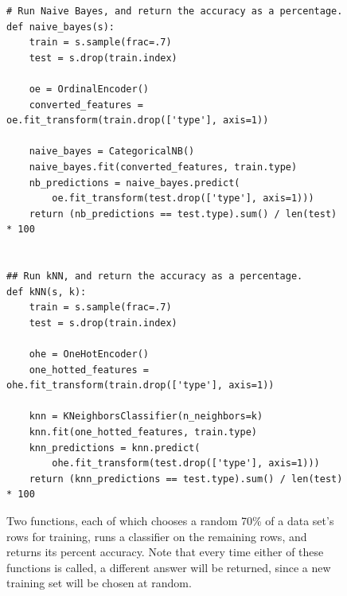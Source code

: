 \begin{figure}[ht]
\centering
\begin{Verbatim}[fontsize=\small,samepage=true,frame=single,framesep=3mm]
# Run Naive Bayes, and return the accuracy as a percentage.
def naive_bayes(s):
    train = s.sample(frac=.7)
    test = s.drop(train.index)

    oe = OrdinalEncoder()
    converted_features = oe.fit_transform(train.drop(['type'], axis=1))

    naive_bayes = CategoricalNB()
    naive_bayes.fit(converted_features, train.type)
    nb_predictions = naive_bayes.predict(
        oe.fit_transform(test.drop(['type'], axis=1)))
    return (nb_predictions == test.type).sum() / len(test) * 100


## Run kNN, and return the accuracy as a percentage.
def kNN(s, k):
    train = s.sample(frac=.7)
    test = s.drop(train.index)

    ohe = OneHotEncoder()
    one_hotted_features = ohe.fit_transform(train.drop(['type'], axis=1))

    knn = KNeighborsClassifier(n_neighbors=k)
    knn.fit(one_hotted_features, train.type)
    knn_predictions = knn.predict(
        ohe.fit_transform(test.drop(['type'], axis=1)))
    return (knn_predictions == test.type).sum() / len(test) * 100
\end{Verbatim}

\caption{Two functions, each of which chooses a random 70\% of a data set's
rows for training, runs a classifier on the remaining rows, and returns its
percent accuracy. Note that every time either of these functions is called, a
different answer will be returned, since a new training set will be chosen at
random.}
\label{comparisonCode}
\end{figure}
